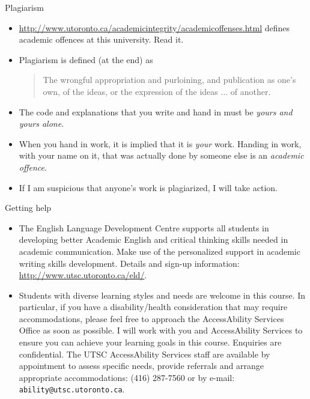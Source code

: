 \documentclass[unknownkeysallowed]{beamer}\usepackage[]{graphicx}\usepackage[]{color}
\begin{document}
\begin{frame}{Plagiarism}

  \begin{itemize}
  \item
    \url{http://www.utoronto.ca/academicintegrity/academicoffenses.html}
    defines academic offences at this university. Read it.
  \item Plagiarism is defined (at the end) as
    \begin{quote}
       The wrongful appropriation and purloining, and publication as one’s own, of the ideas, or the expression of the ideas ... of another.
    \end{quote}
    \item The code and
    explanations  that
    you write and hand in must be \emph{yours and yours
      alone}. 
    \item When you hand in work, it is implied that it is
    \emph{your} work. Handing in work, with your name on it, that was actually done by
    someone else is an \emph{academic offence}.
  \item If I am suspicious
    that anyone's work is plagiarized, I will take action.
    
  \end{itemize}
  
\end{frame}

\begin{frame}[fragile]{Getting help}

  \begin{itemize}
  \item The English Language Development Centre supports all students
    in developing better Academic English and critical thinking skills
    needed in academic communication. Make use of the personalized
    support in academic writing skills development. Details and sign-up information:
    \url{http://www.utsc.utoronto.ca/eld/}.
  \item      Students with diverse learning styles and needs are welcome in this
course. In particular, if you have a disability/health consideration
that may require accommodations, please feel free to approach the AccessAbility Services Office as soon as possible. I will
work with you and AccessAbility Services to ensure you can achieve
your learning goals in this course. Enquiries are confidential. The
UTSC AccessAbility Services staff are available by
appointment to assess specific needs, provide referrals and arrange
appropriate accommodations: (416) 287-7560 or by e-mail: \texttt{ability@utsc.utoronto.ca}.


  \end{itemize}
  
\end{frame}
\end{document}
